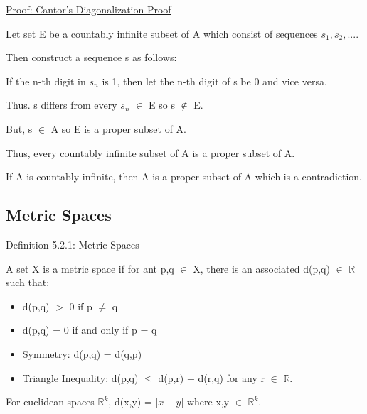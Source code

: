 { \color{magenta} \underline{Proof: Cantor's Diagonalization Proof} } 

	Let set E be a countably infinite subset of A which consist of sequences $s_1,s_2,...$.

	Then construct a sequence s as follows:

	\qquad If the n-th digit in $s_n$ is 1, then let the n-th digit of s be 0
	and vice versa.

	Thus. s differs from every $s_n$ $\in$ E so s $\not \in$ E.

	But, s $\in$ A so E is a proper subset of A.

	Thus, every countably infinite subset of A is a proper subset of A.

	If A is countably infinite, then A is a proper subset of A which
	is a contradiction.





\subsection{ Metric Spaces }

{ \color{blue} Definition 5.2.1: Metric Spaces } 

	\begin{adjustbox}{minipage=14cm, right}
		A set X is a metric space if for ant p,q $\in$ X, there is an associated d(p,q) $\in$
		$\mathbb{R}$ such that:	
		\begin{itemize}[leftmargin=1cm]
			\item d(p,q) $>$ 0 \qquad \qquad if p $\neq$ q
			\item d(p,q) = 0 if and only if p = q
			\item {\color{lblue} Symmetry}:
				d(p,q) = d(q,p)
			\item {\color{lblue} Triangle Inequality}:
				d(p,q) $\leq$ d(p,r) + d(r,q) \qquad \qquad for any r $\in$ $\mathbb{R}$.
		\end{itemize}

		For euclidean spaces $\mathbb{R}^k$, d(x,y) = $| x - y |$ where x,y $\in$ $\mathbb{R}^k$. \\
	\end{adjustbox}


